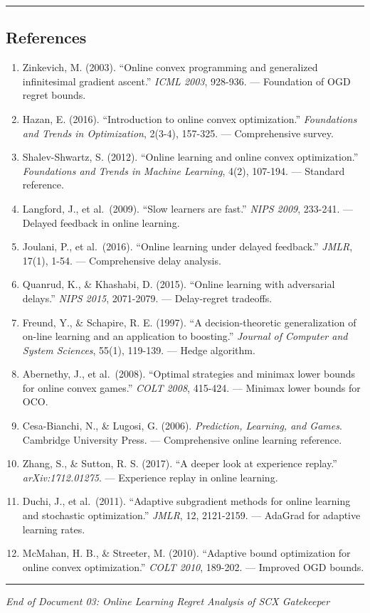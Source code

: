 \documentclass[
  12pt,
]{article}
\providecommand{\tightlist}{%
  \setlength{\itemsep}{0pt}\setlength{\parskip}{0pt}}
\begin{document}
\begin{center}\rule{0.5\linewidth}{0.5pt}\end{center}

\subsection{References}\label{references}

\begin{enumerate}
\def\labelenumi{\arabic{enumi}.}
\tightlist
\item
  Zinkevich, M. (2003). ``Online convex programming and generalized
  infinitesimal gradient ascent.'' \emph{ICML 2003}, 928-936. ---
  Foundation of OGD regret bounds.
\item
  Hazan, E. (2016). ``Introduction to online convex optimization.''
  \emph{Foundations and Trends in Optimization}, 2(3-4), 157-325. ---
  Comprehensive survey.
\item
  Shalev-Shwartz, S. (2012). ``Online learning and online convex
  optimization.'' \emph{Foundations and Trends in Machine Learning},
  4(2), 107-194. --- Standard reference.
\item
  Langford, J., et al.~(2009). ``Slow learners are fast.'' \emph{NIPS
  2009}, 233-241. --- Delayed feedback in online learning.
\item
  Joulani, P., et al.~(2016). ``Online learning under delayed
  feedback.'' \emph{JMLR}, 17(1), 1-54. --- Comprehensive delay
  analysis.
\item
  Quanrud, K., \& Khashabi, D. (2015). ``Online learning with
  adversarial delays.'' \emph{NIPS 2015}, 2071-2079. --- Delay-regret
  tradeoffs.
\item
  Freund, Y., \& Schapire, R. E. (1997). ``A decision-theoretic
  generalization of on-line learning and an application to boosting.''
  \emph{Journal of Computer and System Sciences}, 55(1), 119-139. ---
  Hedge algorithm.
\item
  Abernethy, J., et al.~(2008). ``Optimal strategies and minimax lower
  bounds for online convex games.'' \emph{COLT 2008}, 415-424. ---
  Minimax lower bounds for OCO.
\item
  Cesa-Bianchi, N., \& Lugosi, G. (2006). \emph{Prediction, Learning,
  and Games}. Cambridge University Press. --- Comprehensive online
  learning reference.
\item
  Zhang, S., \& Sutton, R. S. (2017). ``A deeper look at experience
  replay.'' \emph{arXiv:1712.01275}. --- Experience replay in online
  learning.
\item
  Duchi, J., et al.~(2011). ``Adaptive subgradient methods for online
  learning and stochastic optimization.'' \emph{JMLR}, 12, 2121-2159.
  --- AdaGrad for adaptive learning rates.
\item
  McMahan, H. B., \& Streeter, M. (2010). ``Adaptive bound optimization
  for online convex optimization.'' \emph{COLT 2010}, 189-202. ---
  Improved OGD bounds.
\end{enumerate}

\begin{center}\rule{0.5\linewidth}{0.5pt}\end{center}

\emph{End of Document 03: Online Learning Regret Analysis of SCX
Gatekeeper}
\end{document}
